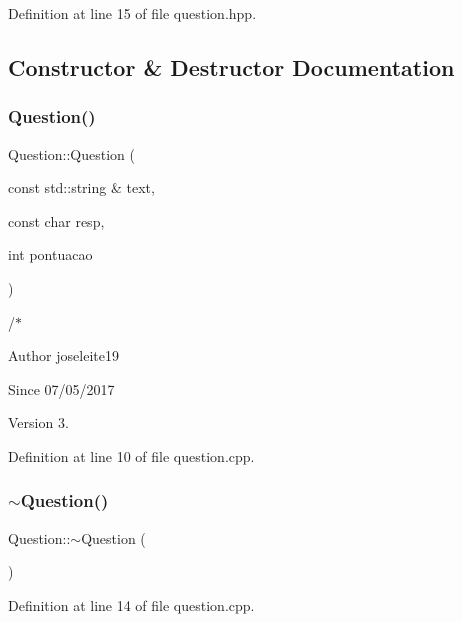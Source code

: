 Definition at line 15 of file question.\+hpp.



\subsection{Constructor \& Destructor Documentation}
\mbox{\label{class_question_a324739668ea82ec4229b7a8c89215acf}} 
\subsubsection{\texorpdfstring{Question()}{Question()}}
{\footnotesize\ttfamily Question\+::\+Question (\begin{DoxyParamCaption}\item[{const std\+::string \&}]{text,  }\item[{const char}]{resp,  }\item[{int}]{pontuacao }\end{DoxyParamCaption})}



/$\ast$ 

\begin{DoxyAuthor}{Author}
joseleite19 
\end{DoxyAuthor}
\begin{DoxySince}{Since}
07/05/2017 
\end{DoxySince}
\begin{DoxyVersion}{Version}
3. 
\end{DoxyVersion}


Definition at line 10 of file question.\+cpp.

\mbox{\label{class_question_a8d9283fb5357e39ed58a743f18629040}} 
\subsubsection{\texorpdfstring{$\sim$\+Question()}{~Question()}}
{\footnotesize\ttfamily Question\+::$\sim$\+Question (\begin{DoxyParamCaption}{ }\end{DoxyParamCaption})}



Definition at line 14 of file question.\+cpp.



